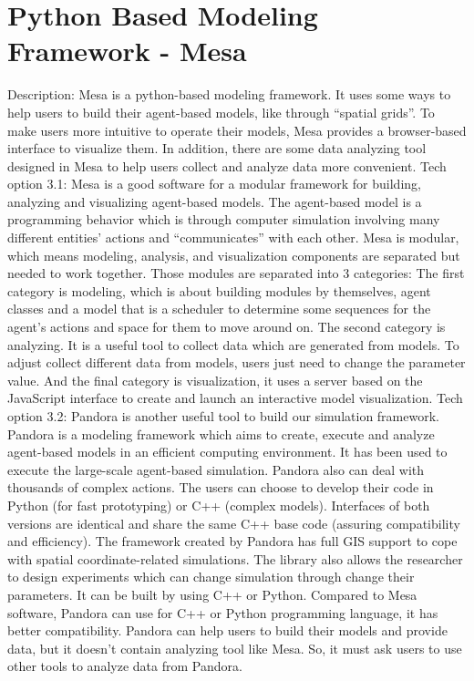\documentclass[draftclsnofoot,onecolumn]{IEEEtran}
\begin{document}
\section{Python Based Modeling Framework - Mesa}
Description: Mesa is a python-based modeling framework. It uses some ways to help users to build their agent-based models, like through “spatial grids”. To make users more intuitive to operate their models, Mesa provides a browser-based interface to visualize them. In addition, there are some data analyzing tool designed in Mesa to help users collect and analyze data more convenient.
\newline
Tech option 3.1: Mesa is a good software for a modular framework for building, analyzing and visualizing agent-based models. The agent-based model is a programming behavior which is through computer simulation involving many different entities’ actions and “communicates” with each other. Mesa is modular, which means modeling, analysis, and visualization components are separated but needed to work together. Those modules are separated into 3 categories:
The first category is modeling, which is about building modules by themselves, agent classes and a model that is a scheduler to determine some sequences for the agent’s actions and space for them to move around on. The second category is analyzing. It is a useful tool to collect data which are generated from models. To adjust collect different data from models, users just need to change the parameter value. And the final category is visualization, it uses a server based on the JavaScript interface to create and launch an interactive model visualization.
\newline
Tech option 3.2: Pandora is another useful tool to build our simulation framework.
Pandora is a modeling framework which aims to create, execute and analyze agent-based models in an efficient computing environment. It has been used to execute the large-scale agent-based simulation. Pandora also can deal with thousands of complex actions. The users can choose to develop their code in Python (for fast prototyping) or C++ (complex models). Interfaces of both versions are identical and share the same C++ base code (assuring compatibility and efficiency).
The framework created by Pandora has full GIS support to cope with spatial coordinate-related simulations. The library also allows the researcher to design experiments which can change simulation through change their parameters. It can be built by using C++ or Python.
Compared to Mesa software, Pandora can use for C++ or Python programming language, it has better compatibility. Pandora can help users to build their models and provide data, but it doesn’t contain analyzing tool like Mesa. So, it must ask users to use other tools to analyze data from Pandora.
\end{document}
